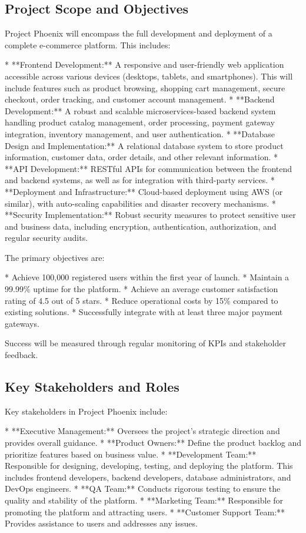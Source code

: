 \documentclass[11pt,a4paper,oneside]{article}
\begin{document}
\subsection{Project Scope and Objectives}

Project Phoenix will encompass the full development and deployment of a complete e-commerce platform.  This includes:

* **Frontend Development:**  A responsive and user-friendly web application accessible across various devices (desktops, tablets, and smartphones).  This will include features such as product browsing, shopping cart management, secure checkout, order tracking, and customer account management.
* **Backend Development:** A robust and scalable microservices-based backend system handling product catalog management, order processing, payment gateway integration, inventory management, and user authentication.
* **Database Design and Implementation:** A relational database system to store product information, customer data, order details, and other relevant information.
* **API Development:** RESTful APIs for communication between the frontend and backend systems, as well as for integration with third-party services.
* **Deployment and Infrastructure:** Cloud-based deployment using AWS (or similar), with auto-scaling capabilities and disaster recovery mechanisms.
* **Security Implementation:**  Robust security measures to protect sensitive user and business data, including encryption, authentication, authorization, and regular security audits.

The primary objectives are:

* Achieve 100,000 registered users within the first year of launch.
* Maintain a 99.99\% uptime for the platform.
* Achieve an average customer satisfaction rating of 4.5 out of 5 stars.
* Reduce operational costs by 15\% compared to existing solutions.
* Successfully integrate with at least three major payment gateways.

Success will be measured through regular monitoring of KPIs and stakeholder feedback.

\subsection{Key Stakeholders and Roles}

Key stakeholders in Project Phoenix include:

* **Executive Management:** Oversees the project's strategic direction and provides overall guidance.
* **Product Owners:** Define the product backlog and prioritize features based on business value.
* **Development Team:** Responsible for designing, developing, testing, and deploying the platform.  This includes frontend developers, backend developers, database administrators, and DevOps engineers.
* **QA Team:**  Conducts rigorous testing to ensure the quality and stability of the platform.
* **Marketing Team:**  Responsible for promoting the platform and attracting users.
* **Customer Support Team:** Provides assistance to users and addresses any issues.
\end{document}

